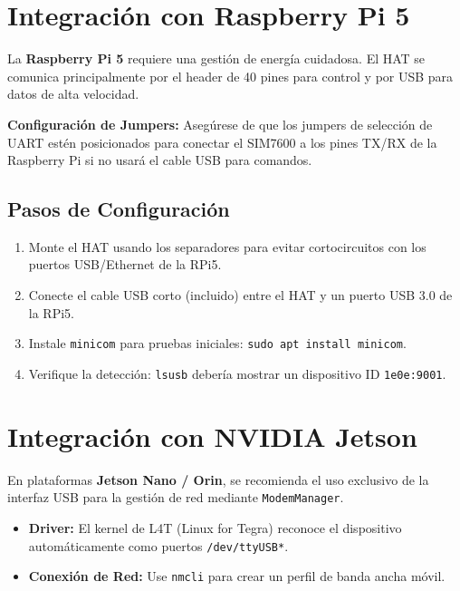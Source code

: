 \documentclass[11pt]{article}
\begin{document}
\section{Integración con Raspberry Pi 5}

La \textbf{Raspberry Pi 5} requiere una gestión de energía cuidadosa. El HAT se comunica principalmente por el header de 40 pines para control y por USB para datos de alta velocidad.

\begin{nota}
\textbf{Configuración de Jumpers:} Asegúrese de que los jumpers de selección de UART estén posicionados para conectar el SIM7600 a los pines TX/RX de la Raspberry Pi si no usará el cable USB para comandos.
\end{nota}

\subsection{Pasos de Configuración}
\begin{enumerate}
    \item Monte el HAT usando los separadores para evitar cortocircuitos con los puertos USB/Ethernet de la RPi5.
    \item Conecte el cable USB corto (incluido) entre el HAT y un puerto USB 3.0 de la RPi5.
    \item Instale \texttt{minicom} para pruebas iniciales: \texttt{sudo apt install minicom}.
    \item Verifique la detección: \texttt{lsusb} debería mostrar un dispositivo ID \texttt{1e0e:9001}.
\end{enumerate}

\section{Integración con NVIDIA Jetson}

En plataformas \textbf{Jetson Nano / Orin}, se recomienda el uso exclusivo de la interfaz USB para la gestión de red mediante \texttt{ModemManager}.

\begin{itemize}
    \item \textbf{Driver:} El kernel de L4T (Linux for Tegra) reconoce el dispositivo automáticamente como puertos \texttt{/dev/ttyUSB*}.
    \item \textbf{Conexión de Red:} Use \texttt{nmcli} para crear un perfil de banda ancha móvil.
\end{itemize}
\end{document}
